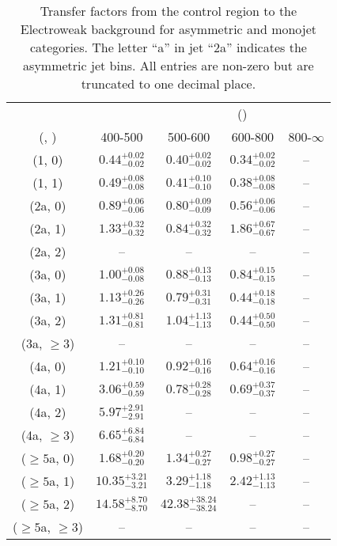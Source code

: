 \begin{table}[h!]
\tiny
\centering
\caption{Transfer factors from the \gj control region to the Electroweak background for asymmetric and monojet categories. The letter ``a'' in jet \eg ``2a''  indicates the asymmetric jet bins. All entries are non-zero but are truncated to one decimal place.\label{tab:tf_gj_total_asym}}
\begin{tabular}
{ccccc}
	\hline\hline
&	& \multicolumn{4}{c}{\scalht (\gev)} \\ 
	 (\njet,  \nb) & 400-500 & 500-600 & 600-800 & 800-$\infty$ \\ [0.8ex] 
\hline
	(1, 0) & $0.44^{+ 0.02 }_{- 0.02 }$ & $0.40^{+ 0.02 }_{- 0.02 }$ & $0.34^{+ 0.02 }_{- 0.02 }$ & -- \\[0.5ex] 
	(1, 1) & $0.49^{+ 0.08 }_{- 0.08 }$ & $0.41^{+ 0.10 }_{- 0.10 }$ & $0.38^{+ 0.08 }_{- 0.08 }$ & -- \\[0.5ex] 
	(2a, 0) & $0.89^{+ 0.06 }_{- 0.06 }$ & $0.80^{+ 0.09 }_{- 0.09 }$ & $0.56^{+ 0.06 }_{- 0.06 }$ & -- \\[0.5ex] 
	(2a, 1) & $1.33^{+ 0.32 }_{- 0.32 }$ & $0.84^{+ 0.32 }_{- 0.32 }$ & $1.86^{+ 0.67 }_{- 0.67 }$ & -- \\[0.5ex] 
	(2a, 2) & -- & -- & -- & -- \\[0.5ex] 
	(3a, 0) & $1.00^{+ 0.08 }_{- 0.08 }$ & $0.88^{+ 0.13 }_{- 0.13 }$ & $0.84^{+ 0.15 }_{- 0.15 }$ & -- \\[0.5ex] 
	(3a, 1) & $1.13^{+ 0.26 }_{- 0.26 }$ & $0.79^{+ 0.31 }_{- 0.31 }$ & $0.44^{+ 0.18 }_{- 0.18 }$ & -- \\[0.5ex] 
	(3a, 2) & $1.31^{+ 0.81 }_{- 0.81 }$ & $1.04^{+ 1.13 }_{- 1.13 }$ & $0.44^{+ 0.50 }_{- 0.50 }$ & -- \\[0.5ex] 
	(3a, $\ge3$) & -- & -- & -- & -- \\[0.5ex] 
	(4a, 0) & $1.21^{+ 0.10 }_{- 0.10 }$ & $0.92^{+ 0.16 }_{- 0.16 }$ & $0.64^{+ 0.16 }_{- 0.16 }$ & -- \\[0.5ex] 
	(4a, 1) & $3.06^{+ 0.59 }_{- 0.59 }$ & $0.78^{+ 0.28 }_{- 0.28 }$ & $0.69^{+ 0.37 }_{- 0.37 }$ & -- \\[0.5ex] 
	(4a, 2) & $5.97^{+ 2.91 }_{- 2.91 }$ & -- & -- & -- \\[0.5ex] 
	(4a, $\ge3$) & $6.65^{+ 6.84 }_{- 6.84 }$ & -- & -- & -- \\[0.5ex] 
	($\ge5$a, 0) & $1.68^{+ 0.20 }_{- 0.20 }$ & $1.34^{+ 0.27 }_{- 0.27 }$ & $0.98^{+ 0.27 }_{- 0.27 }$ & -- \\[0.5ex] 
	($\ge5$a, 1) & $10.35^{+ 3.21 }_{- 3.21 }$ & $3.29^{+ 1.18 }_{- 1.18 }$ & $2.42^{+ 1.13 }_{- 1.13 }$ & -- \\[0.5ex] 
	($\ge5$a, 2) & $14.58^{+ 8.70 }_{- 8.70 }$ & $42.38^{+ 38.24 }_{- 38.24 }$ & -- & -- \\[0.5ex] 
	($\ge5$a, $\ge3$) & -- & -- & -- & -- \\[0.5ex] 
	\hline
	\hline
\end{tabular}
\end{table}
